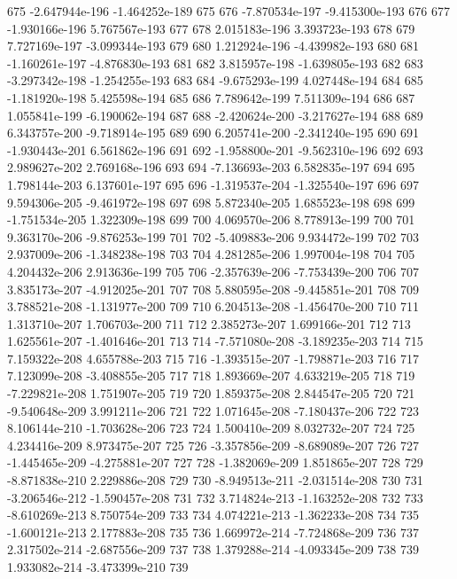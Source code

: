 \documentclass{article}
\begin{document}
\begin{Schunk}
\begin{Soutput}
675  -2.647944e-196 -1.464252e-189  675
676  -7.870534e-197 -9.415300e-193  676
677  -1.930166e-196  5.767567e-193  677
678   2.015183e-196  3.393723e-193  678
679   7.727169e-197 -3.099344e-193  679
680   1.212924e-196 -4.439982e-193  680
681  -1.160261e-197 -4.876830e-193  681
682   3.815957e-198 -1.639805e-193  682
683  -3.297342e-198 -1.254255e-193  683
684  -9.675293e-199  4.027448e-194  684
685  -1.181920e-198  5.425598e-194  685
686   7.789642e-199  7.511309e-194  686
687   1.055841e-199 -6.190062e-194  687
688  -2.420624e-200 -3.217627e-194  688
689   6.343757e-200 -9.718914e-195  689
690   6.205741e-200 -2.341240e-195  690
691  -1.930443e-201  6.561862e-196  691
692  -1.958800e-201 -9.562310e-196  692
693   2.989627e-202  2.769168e-196  693
694  -7.136693e-203  6.582835e-197  694
695   1.798144e-203  6.137601e-197  695
696  -1.319537e-204 -1.325540e-197  696
697   9.594306e-205 -9.461972e-198  697
698   5.872340e-205  1.685523e-198  698
699  -1.751534e-205  1.322309e-198  699
700   4.069570e-206  8.778913e-199  700
701   9.363170e-206 -9.876253e-199  701
702  -5.409883e-206  9.934472e-199  702
703   2.937009e-206 -1.348238e-198  703
704   4.281285e-206  1.997004e-198  704
705   4.204432e-206  2.913636e-199  705
706  -2.357639e-206 -7.753439e-200  706
707   3.835173e-207 -4.912025e-201  707
708   5.880595e-208 -9.445851e-201  708
709   3.788521e-208 -1.131977e-200  709
710   6.204513e-208 -1.456470e-200  710
711   1.313710e-207  1.706703e-200  711
712   2.385273e-207  1.699166e-201  712
713   1.625561e-207 -1.401646e-201  713
714  -7.571080e-208 -3.189235e-203  714
715   7.159322e-208  4.655788e-203  715
716  -1.393515e-207 -1.798871e-203  716
717   7.123099e-208 -3.408855e-205  717
718   1.893669e-207  4.633219e-205  718
719  -7.229821e-208  1.751907e-205  719
720   1.859375e-208  2.844547e-205  720
721  -9.540648e-209  3.991211e-206  721
722   1.071645e-208 -7.180437e-206  722
723   8.106144e-210 -1.703628e-206  723
724   1.500410e-209  8.032732e-207  724
725   4.234416e-209  8.973475e-207  725
726  -3.357856e-209 -8.689089e-207  726
727  -1.445465e-209 -4.275881e-207  727
728  -1.382069e-209  1.851865e-207  728
729  -8.871838e-210  2.229886e-208  729
730  -8.949513e-211 -2.031514e-208  730
731  -3.206546e-212 -1.590457e-208  731
732   3.714824e-213 -1.163252e-208  732
733  -8.610269e-213  8.750754e-209  733
734   4.074221e-213 -1.362233e-208  734
735  -1.600121e-213  2.177883e-208  735
736   1.669972e-214 -7.724868e-209  736
737   2.317502e-214 -2.687556e-209  737
738   1.379288e-214 -4.093345e-209  738
739   1.933082e-214 -3.473399e-210  739

\end{Soutput}
\end{Schunk}
\end{document}
